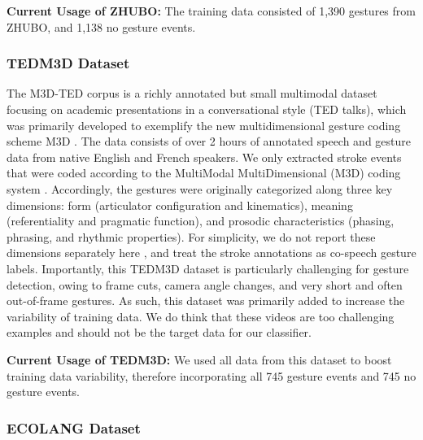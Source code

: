 \documentclass[11pt,smallheadings,cleardoublepage=empty,tocflat,numbers=noenddot,twoside,captions=tableheading]{scrbook}
\begin{document}
\begin{refsection}
\textbf{Current Usage of ZHUBO:} The training data consisted of 1,390 gestures from ZHUBO, and 1,138 no gesture events.

\subsubsection{TEDM3D Dataset}
The M3D-TED corpus \parencite{rohrerTemporalPragmaticAnalysis2022} is a richly annotated but small multimodal dataset focusing on academic presentations in a conversational style (TED talks), which was primarily developed to exemplify the new multidimensional gesture coding scheme M3D \parencite{rohrerTemporalPragmaticAnalysis2022}. The data consists of over 2 hours of annotated speech and gesture data from native English and French speakers. We only extracted stroke events that were coded according to the MultiModal MultiDimensional (M3D) coding system \parencite{rohrerMultiModalMultiDimensionalM3D}. Accordingly, the gestures were originally categorized along three key dimensions: form (articulator configuration and kinematics), meaning (referentiality and pragmatic function), and prosodic characteristics (phasing, phrasing, and rhythmic properties). For simplicity, we do not report these dimensions separately here \parencite{rohrerTemporalPragmaticAnalysis2022}, and treat the stroke annotations as co-speech gesture labels. Importantly, this TEDM3D dataset is particularly challenging for gesture detection, owing to frame cuts, camera angle changes, and very short and often out-of-frame gestures. As such, this dataset was primarily added to increase the variability of training data. We do think that these videos are too challenging examples and should not be the target data for our classifier.

\textbf{Current Usage of TEDM3D:} We used all data from this dataset to boost training data variability, therefore incorporating all 745 gesture events and 745 no gesture events.

\subsubsection{ECOLANG Dataset}


\end{refsection}
\end{document}

